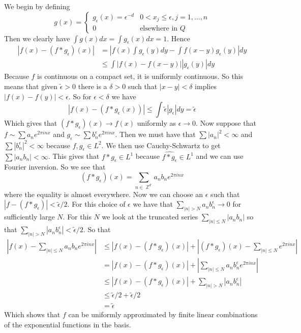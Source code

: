 \documentclass{article}
\DeclareMathOperator{\Z}{\mathbb{Z}}
\newcommand{\problempart}[1]{\noindent{\textbf{(#1)}}}
\begin{document}
\problempart{f} We begin by defining 
\[
g(x) = \begin{cases}
g_\epsilon(x) = \epsilon^{-d} & 0 < x_j \leq \epsilon, j = 1,\ldots, n \\
0                                            & \text{elsewhere in } Q
\end{cases}
\]
Then we clearly have $\int g(x)dx = \int g_\epsilon(x)dx = 1$. Hence
\begin{align*}
|f(x) - (f*g_\epsilon)(x)| &= \left| f(x)\int g_\epsilon(y)dy - \int f(x-y)g_\epsilon(y)\right|dy \\
&\leq \int |f(x) - f(x-y)||g_\epsilon(y)|dy
\end{align*}
Because $f$ is continuous on a compact set, it is uniformly continuous. So this means that given $\tilde{\epsilon} > 0$ there is a $\delta > 0$ such that $|x - y| < \delta$ implies $|f(x) - f(y)| < \epsilon$. So for $\epsilon < \delta$ we have
\[
|f(x) - (f * g_\epsilon(x))| \leq \int \tilde{\epsilon}|g_\epsilon|dy = \tilde{\epsilon}
\]
Which gives that $(f * g_\epsilon)(x) \to f(x)$ uniformly as $\epsilon \to 0$. Now suppose that $f \sim \sum a_ne^{2\pi inx}$ and $g_\epsilon \sim \sum b_n^\epsilon e^{2\pi inx}$. Then we must have that $\sum |a_n|^2 < \infty$ and $\sum |b_n^\epsilon|^2 < \infty$ because $f,g_\epsilon \in L^2$. We then use Cauchy-Schwartz to get $\sum |a_nb_n| < \infty$. This gives that $f * g_\epsilon \in L^1$ because $\hat{f * g_\epsilon} \in L^1$ and we can use Fourier inversion. So we see that 
\[
(f * g_\epsilon)(x) = \sum_{n \in \Z^d} a_nb_ne^{2\pi inx}
\]
where the equality is almost everywhere. Now we can choose an $\epsilon$ such that $|f - (f * g_\epsilon)| < \tilde{\epsilon}/2$. For this choice of $\epsilon$ we have that $\sum_{|n| > N} a_nb_n^\epsilon \to 0$ for sufficiently large $N$. For this $N$ we look at the truncated series $\sum_{|n| \leq N} |a_nb_n|$ so that $\sum_{|n| > N} |a_nb_n^\epsilon| < \tilde{\epsilon}/2$. So that 
\begin{align*}
\left| f(x) - \sum_{|n| \leq N} a_nb_ne^{2\pi inx} \right| &\leq |f(x) - (f*g_\epsilon)(x)| + \left|(f * g_\epsilon)(x) - \sum_{|n| \leq N} e^{2\pi inx}\right| \\
&= |f(x) - (f*g_\epsilon)(x)| + \left|\sum_{|n| \leq N} a_nb_n^\epsilon e^{2\pi inx}\right| \\ 
&\leq |f(x) - (f*g_\epsilon)(x)| + \sum_{|n| > N} |a_nb_n^\epsilon| \\
&\leq \tilde{\epsilon}/2 + \tilde{\epsilon}/2 \\
&= \tilde{\epsilon}
\end{align*}
Which shows that $f$ can be uniformly approximated by finite linear combinations of the exponential functions in the basis. 
\end{document}
